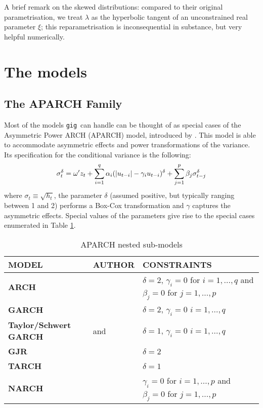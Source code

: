 \documentclass[a4paper,11pt]{article}
\newcommand{\uhat}{\ensuremath u}
\newcommand{\gig}{\texttt{gig}}
\begin{document}
A brief remark on the skewed distributions: compared to their original
parametrisation, we treat $\lambda$ as the hyperbolic tangent of an
unconstrained real parameter $\xi$; this reparametrisation is
inconsequential in substance, but very helpful numerically.

\section{The models}
\label{sec:models}

\subsection{The APARCH Family}
\label{sec:APARCH}

Most of the models \gig\ can handle can be thought of as special
cases of the Asymmetric Power ARCH (APARCH) model, introduced by
\cite{Ding-Engle-Granger}. This model is able to accommodate
asymmetric effects and power transformations of the variance. Its
specification for the conditional variance is the following:
\begin{equation} \label{eq:aparch} \sigma_t^\delta = \omega'z_t +
  \sum_{i=1}^q \alpha_i(|\uhat_{t-i}| - \gamma_i
  \uhat_{t-i})^\delta + \sum_{j=1}^p\beta_j\sigma_{t-j}^\delta
\end{equation}
where $\sigma_t \equiv \sqrt{h_t}$, the parameter $\delta$ (assumed
positive, but typically ranging between 1 and 2) performs a Box-Cox
transformation and $\gamma$ captures the asymmetric effects.  Special
values of the parameters give rise to the special cases enumerated in
Table \ref{tab:APARCH-submodels}.

\begin{table}[hptb]
  \centering
  \begin{tabular}{p{}p{}p{}}
    \hline
    MODEL & AUTHOR & CONSTRAINTS \\
    \hline
    \textbf{ARCH} & \cite{Engle-82} & $\delta=2$, $\gamma_i = 0$ for
 $ i=1,\ldots,q$ and $\beta_j = 0$ for $j=1,\ldots,p$ \\
 \hline
 \textbf{GARCH} & \cite{Bollerslev-86} & $\delta=2$,
  $\gamma_i = 0$ $ i=1,\ldots,q$ \\
  \hline
  \textbf{Taylor/Schwert GARCH} & \cite{Taylor} and \cite{Schwert} & $\delta=1$,
  $\gamma_i = 0$ $ i=1,\ldots,q$\\
  \hline
  \textbf{GJR} & \cite{Glosten-Jagannathan-Runkle} & $\delta=2$ \\
  \hline
  \textbf{TARCH} & \cite{Zakoian} & $\delta=1$\\
  \hline
  \textbf{NARCH} & \cite{Higgins-Bera} & $\gamma_i = 0$ for
  $ i=1,\ldots,p$ and $\beta_j = 0$ for $j=1,\ldots,p$\\
  \hline
  \end{tabular}
  \caption{APARCH nested sub-models}
  \label{tab:APARCH-submodels}
\end{table}
\end{document}
